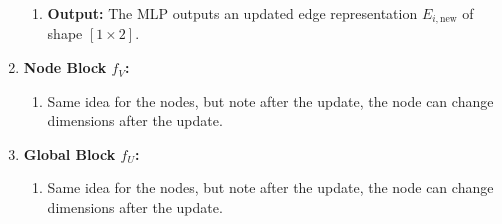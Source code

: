\begin{example}
\begin{enumerate}
\begin{enumerate}
            \item \textbf{Output:} The MLP outputs an updated edge representation $E_{i,\text{new}}$ of shape $[1 \times 2]$.
        \end{enumerate}
        \newpage
        \item \textbf{Node Block $f_V$:}
        \begin{enumerate}
            \item Same idea for the nodes, but note after the update, the node can change dimensions after the update. 
        \end{enumerate}
        \item \textbf{Global Block $f_U$:}
        \begin{enumerate}
            \item Same idea for the nodes, but note after the update, the node can change dimensions after the update. 
        \end{enumerate}
    \end{enumerate}
\end{example}